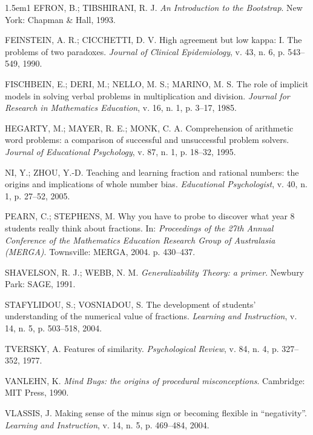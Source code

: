 \documentclass[11pt,a4paper]{article}
\begin{document}
\begin{hangparas}{1.5em}{1}
EFRON, B.; TIBSHIRANI, R. J. \emph{An Introduction to the Bootstrap}. New York: Chapman \& Hall, 1993.\par

FEINSTEIN, A. R.; CICCHETTI, D. V. High agreement but low kappa: I. The problems of two paradoxes. \emph{Journal of Clinical Epidemiology}, v. 43, n. 6, p. 543--549, 1990.\par

FISCHBEIN, E.; DERI, M.; NELLO, M. S.; MARINO, M. S. The role of implicit models in solving verbal problems in multiplication and division. \emph{Journal for Research in Mathematics Education}, v. 16, n. 1, p. 3--17, 1985.\par

HEGARTY, M.; MAYER, R. E.; MONK, C. A. Comprehension of arithmetic word problems: a comparison of successful and unsuccessful problem solvers. \emph{Journal of Educational Psychology}, v. 87, n. 1, p. 18--32, 1995.\par

NI, Y.; ZHOU, Y.-D. Teaching and learning fraction and rational numbers: the origins and implications of whole number bias. \emph{Educational Psychologist}, v. 40, n. 1, p. 27--52, 2005.\par

PEARN, C.; STEPHENS, M. Why you have to probe to discover what year 8 students really think about fractions. In: \emph{Proceedings of the 27th Annual Conference of the Mathematics Education Research Group of Australasia (MERGA)}. Townsville: MERGA, 2004. p. 430--437.\par

SHAVELSON, R. J.; WEBB, N. M. \emph{Generalizability Theory: a primer}. Newbury Park: SAGE, 1991.\par

STAFYLIDOU, S.; VOSNIADOU, S. The development of students' understanding of the numerical value of fractions. \emph{Learning and Instruction}, v. 14, n. 5, p. 503--518, 2004.\par

TVERSKY, A. Features of similarity. \emph{Psychological Review}, v. 84, n. 4, p. 327--352, 1977.\par

VANLEHN, K. \emph{Mind Bugs: the origins of procedural misconceptions}. Cambridge: MIT Press, 1990.\par

VLASSIS, J. Making sense of the minus sign or becoming flexible in ``negativity''. \emph{Learning and Instruction}, v. 14, n. 5, p. 469--484, 2004.\par
\end{hangparas}
\endgroup
\end{document}
